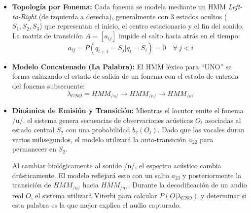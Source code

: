 \documentclass[12pt]{article}
\begin{document}
\begin{itemize}
\begin{enumerate}
			\begin{itemize}
				\item \textbf{Topología por Fonema:} Cada fonema se modela mediante un HMM \textit{Left-to-Right} (de izquierda a derecha), generalmente con 3 estados ocultos ($S_1, S_2, S_3$) que representan el inicio, el centro estacionario y el fin del sonido. La matriz de transición $A = [a_{ij}]$ impide el salto hacia atrás en el tiempo:
				\begin{equation}
					a_{ij} = P(q_{t+1}=S_j | q_t=S_i) = 0 \quad \forall \ j < i
				\end{equation}
				
				\item \textbf{Modelo Concatenado (La Palabra):} El HMM léxico para ``UNO'' se forma enlazando el estado de salida de un fonema con el estado de entrada del fonema subsecuente:
				\begin{equation}
					\lambda_{UNO} = HMM_{/u/} \rightarrow HMM_{/n/} \rightarrow HMM_{/o/}
				\end{equation}
				
				\item \textbf{Dinámica de Emisión y Transición:} Mientras el locutor emite el fonema /u/, el sistema genera secuencias de observaciones acústicas $O_t$ asociadas al estado central $S_2$ con una probabilidad $b_2(O_t)$. Dado que las vocales duran varios milisegundos, el modelo utilizará la auto-transición $a_{22}$ para permanecer en $S_2$. 
				
				Al cambiar biológicamente al sonido /n/, el espectro acústico cambia drásticamente. El modelo reflejará esto con un salto $a_{23}$ y posteriormente la transición de $HMM_{/u/}$ hacia $HMM_{/n/}$. Durante la decodificación de un audio real $O$, el sistema utilizará Viterbi para calcular $P(O | \lambda_{UNO})$ y determinar si esta palabra es la que mejor explica el audio capturado.
			\end{itemize}
			
		\end{enumerate}
		
		
		
		
	\end{itemize}
	
	
	
	
	\newpage
\end{document}
